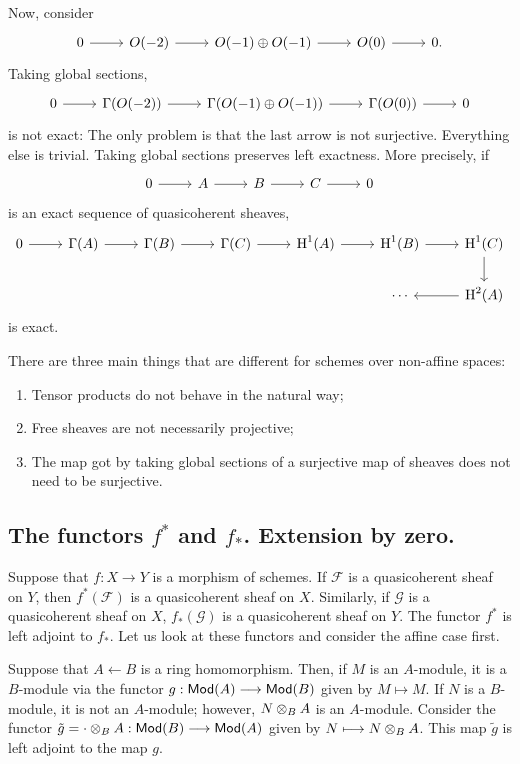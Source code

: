 \documentclass [11 pt, oneside] {article}
\begin{document}
Now, consider 
\[
\begin{tikzcd}
	0\ar[r]&\mathscr{O}(-2) \ar[r] &\mathscr{O}(-1) \oplus \mathscr{O}(-1) \ar[r] & \mathscr{O}(0) \ar[r] &0.
\end{tikzcd}
\]
Taking global sections,
\[
\begin{tikzcd}
	0\ar[r]&\Gamma(\mathscr{O}(-2)) \ar[r] &\Gamma (\mathscr{O}(-1) \oplus \mathscr{O}(-1)) \ar[r] & \Gamma(\mathscr{O}(0)) \ar[r] &0
\end{tikzcd}
\]
is not exact: The only problem is that the last arrow is not surjective. Everything else is trivial. Taking global sections preserves left exactness. More precisely, if
\[
\begin{tikzcd}
	0\ar[r]&\mathscr{A}\ar[r]&\mathscr{B}\ar[r]&\mathscr{C}\ar[r]&0
\end{tikzcd}
\]
is an exact sequence of quasicoherent sheaves,
\[
\begin{tikzcd}
	0\ar[r] &\Gamma(\mathscr{A}) \ar[r]& \Gamma(\mathscr{B})\ar[r]&\Gamma(\mathscr{C}) \ar[r]&\HH^1(\mathscr{A}) \ar[r]&\HH^1(\mathscr{B}) \ar[r]&\HH^1(\mathscr{C})\ar[d]\\&&&&&\cdots&\HH^2(\mathscr{A}) \ar[l]
\end{tikzcd}
\]
is exact.

There are three main things that are different for schemes over non-affine spaces:
\begin{enumerate}
	\item Tensor products do not behave in the natural way;
	\item Free sheaves are not necessarily projective;
	\item The map got by taking global sections of a surjective map of sheaves does not need to be surjective.
\end{enumerate}

\subsection{The functors \texorpdfstring{$f^*$}{f*} and \texorpdfstring{$f_*$}{f*}. Extension by zero.}
Suppose that $f:X\longrightarrow Y$ is a morphism of schemes. If $\mathscr{F}$ is a quasicoherent sheaf on $Y$, then $f^*(\mathscr{F})$ is a quasicoherent sheaf on $X$. Similarly, if $\mathscr{G}$ is a quasicoherent sheaf on $X$, $f_*(\mathscr{G})$ is a quasicoherent sheaf on $Y$. The functor $f^*$ is left adjoint to $f_*$. Let us look at these functors and consider the affine case first. 

Suppose that $A \longleftarrow B$ is a ring homomorphism. Then, if $M$ is an $A$-module, it is a $B$-module via the functor $g: \textsf{Mod}(A) \longrightarrow \textsf{Mod}(B)$ given by $M\longmapsto M$. If $N$ is a $B$-module, it is not an $A$-module; however, $N\otimes_B A$ is an $A$-module. Consider the functor $\tilde g = \cdot\otimes_B A: \textsf{Mod}(B) \longrightarrow \textsf{Mod}(A)$ given by $N\longmapsto N\otimes_B A$. This map $\tilde g$ is left adjoint to the map $g$. 
\end{document}
